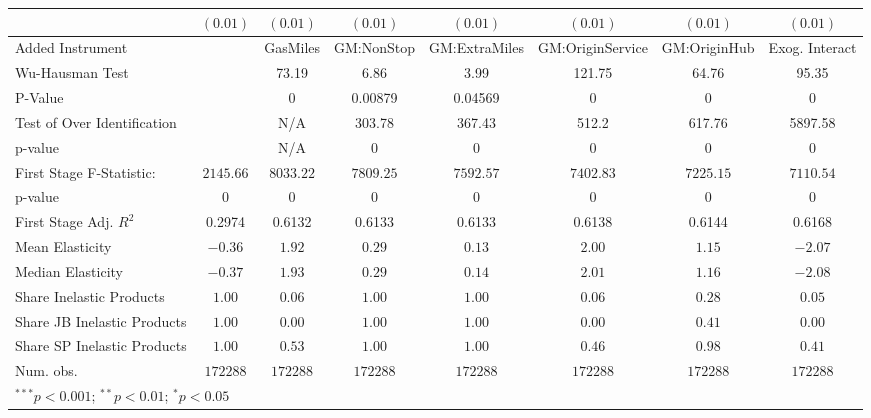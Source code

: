 \begin{tabular}{l c c c c c c c}
                             & $(0.01)$      & $(0.01)$      & $(0.01)$      & $(0.01)$      & $(0.01)$         & $(0.01)$      & $(0.01)$       \\
\midrule
Added Instrument             &               & GasMiles      & GM:NonStop    & GM:ExtraMiles & GM:OriginService & GM:OriginHub  & Exog. Interact \\
Wu-Hausman Test              &               & 73.19         & 6.86          & 3.99          & 121.75           & 64.76         & 95.35          \\
P-Value                      &               & 0             & 0.00879       & 0.04569       & 0                & 0             & 0              \\
Test of Over Identification  &               & N/A           & 303.78        & 367.43        & 512.2            & 617.76        & 5897.58        \\
p-value                      &               & N/A           & 0             & 0             & 0                & 0             & 0              \\
First Stage F-Statistic:     & $2145.66$     & $8033.22$     & $7809.25$     & $7592.57$     & $7402.83$        & $7225.15$     & $7110.54$      \\
p-value                      & $0$           & $0$           & $0$           & $0$           & $0$              & $0$           & $0$            \\
First Stage Adj. $R^2$       & 0.2974        & 0.6132        & 0.6133        & 0.6133        & 0.6138           & 0.6144        & 0.6168         \\
Mean Elasticity              & $-0.36$       & $1.92$        & $0.29$        & $0.13$        & $2.00$           & $1.15$        & $-2.07$        \\
Median Elasticity            & $-0.37$       & $1.93$        & $0.29$        & $0.14$        & $2.01$           & $1.16$        & $-2.08$        \\
Share Inelastic Products     & $1.00$        & $0.06$        & $1.00$        & $1.00$        & $0.06$           & $0.28$        & $0.05$         \\
Share JB Inelastic Products  & $1.00$        & $0.00$        & $1.00$        & $1.00$        & $0.00$           & $0.41$        & $0.00$         \\
Share SP Inelastic Products  & $1.00$        & $0.53$        & $1.00$        & $1.00$        & $0.46$           & $0.98$        & $0.41$         \\
Num. obs.                    & $172288$      & $172288$      & $172288$      & $172288$      & $172288$         & $172288$      & $172288$       \\
\bottomrule
\multicolumn{8}{l}{\scriptsize{$^{***}p<0.001$; $^{**}p<0.01$; $^{*}p<0.05$}}
\end{tabular}
